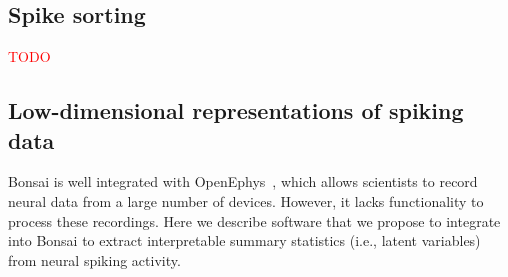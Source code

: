 \documentclass[a4paper,11point]{article}
\begin{document}
\subsection{Spike sorting}
\label{sec:spikeSorting}

\noindent\textcolor{red}{TODO}

\subsection{Low-dimensional representations of spiking data}
\label{sec:lowDimensionalRepresentationsOfSpikingData}

Bonsai is well integrated with OpenEphys~\citep{siegleEtAl17}, which allows
scientists to record neural data from a large number of devices. However, it
lacks functionality to process these recordings. Here we describe software that
we propose to integrate into Bonsai to extract interpretable summary statistics
(i.e., latent variables) from neural spiking activity.
\end{document}
